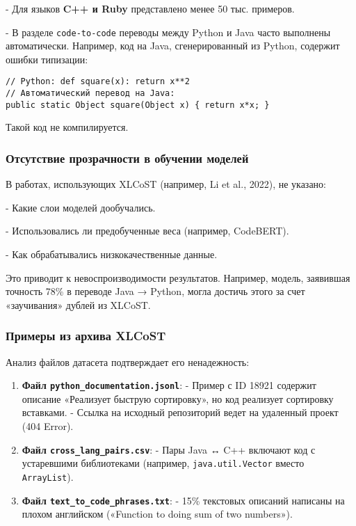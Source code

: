     
- Для языков \textbf{C++ и Ruby} представлено менее 50 тыс. примеров.
    
- В разделе \texttt{code-to-code} переводы между Python и Java часто выполнены автоматически. Например, код на Java, сгенерированный из Python, содержит ошибки типизации:
      \begin{verbatim}
// Python: def square(x): return x**2
// Автоматический перевод на Java:
public static Object square(Object x) { return x*x; }
      \end{verbatim}
      Такой код не компилируется.


\subsubsection{Отсутствие прозрачности в обучении моделей}

В работах, использующих XLCoST (например, Li et al., 2022), не указано:

    
- Какие слои моделей дообучались.
    
- Использовались ли предобученные веса (например, CodeBERT).
    
- Как обрабатывались низкокачественные данные.


Это приводит к невоспроизводимости результатов. Например, модель, заявившая точность 78\% в переводе Java → Python, могла достичь этого за счет «заучивания» дублей из XLCoST.

\subsubsection{Примеры из архива XLCoST}

Анализ файлов датасета подтверждает его ненадежность:
\begin{enumerate}
    \item \textbf{Файл \texttt{python\_documentation.jsonl}}:  
      - Пример с ID 18921 содержит описание «Реализует быструю сортировку», но код реализует сортировку вставками.  
      - Ссылка на исходный репозиторий ведет на удаленный проект (404 Error).
    \item \textbf{Файл \texttt{cross\_lang\_pairs.csv}}:  
      - Пары Java ↔ C++ включают код с устаревшими библиотеками (например, \texttt{java.util.Vector} вместо \texttt{ArrayList}).
    \item \textbf{Файл \texttt{text\_to\_code\_phrases.txt}}:  
      - 15\% текстовых описаний написаны на плохом английском («Function to doing sum of two numbers»).
\end{enumerate}


